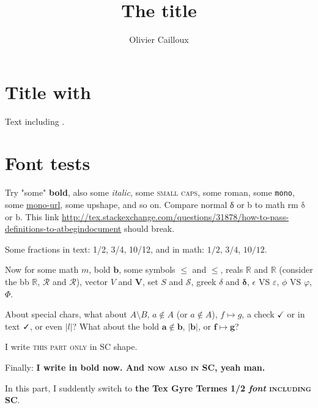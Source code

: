 \documentclass[french, english]{llncs}
\begin{document}
\title{The title}
\author{Olivier Cailloux}
\makeatletter
\makeatother
\maketitle

\section{Title with \electreTRI}
Text including \electreTRI.

\section{Font tests}
Try "some" \textbf{bold}, also some \textit{italic}, some \textsc{small caps}, some \textrm{roman}, some \texttt{mono}, some \url{mono-url}, some \textup{upshape}, and so on. Compare normal δ or b to math rm $\mathrm{\delta}$ or $\mathrm{b}$.
This link \url{http://tex.stackexchange.com/questions/31878/how-to-pass-definitions-to-atbegindocument} should break.

Some fractions in text: 1/2, 3/4, 10/12, and in math: $1/2$, $3/4$, $10/12$.


Now for some math $m$, bold $\mathbf{b}$, some symbols $≤$ and $\mathbf{≤}$, reals $ℝ$ and $\mathbf{ℝ}$ (consider the bb $\mathbb{R}$, $\mathcal{R}$ and $\mathscr{R}$), vector $V$ and $\mathbf{V}$, set $S$ and $\mathcal{S}$, greek $\delta$ and $\mathbf{\delta}$, $\epsilon$ VS $\varepsilon$, $\phi$ VS $\varphi$, $\Phi$.

About special chars, what about $A \setminus B$, $a ∉ A$ (or $a \notin A$), $f \mapsto g$, a check $✓$ or in text ✓, or even $\lvert l\rvert$? What about the bold $\mathbf{a \notin b}$, $\mathbf{\lvert b\rvert}$, or $\mathbf{f \mapsto g}$?

I write \textsc{this part only} in SC shape.

Finally: \textbf{I write in bold now. And \textsc{now also in SC}, yeah man.}

{In this part, I suddently \texgyretermesfamily switch to \textbf{the Tex Gyre Termes 1/2 \textit{font} \textsc{including SC}}.}

\end{document}
